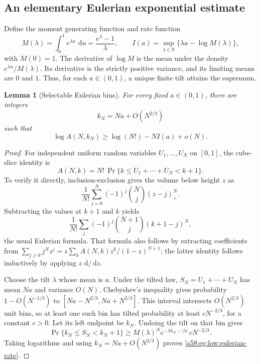 \documentclass[11pt,letterpaper]{article}
\newtheorem{lemma}[theorem]{Lemma}
\theoremstyle{remark}
\newcommand{\egdd}{\,\mathrm d}
\begin{document}
\subsection{An elementary Eulerian exponential estimate}

Define the moment generating function and rate function
\begin{equation}\label{a58:eg:low:rate-def}
 M(\lambda)=\int_0^1 e^{\lambda u}\,\egdd u
 =\frac{e^\lambda-1}{\lambda},\qquad
 I(a)=\sup_{\lambda\in\mathbb R}
 \{\lambda a-\log M(\lambda)\},
\end{equation}
with \(M(0)=1\). The derivative of \(\log M\) is the mean under the
density \(e^{\lambda u}/M(\lambda)\). Its derivative is the strictly
positive variance, and its limiting means are \(0\) and \(1\).
Thus, for each \(a\in(0,1)\), a unique finite tilt attains the supremum.

\begin{lemma}[Selectable Eulerian bins]\label{a58:eg:low:eulerian-bins}
For every fixed \(a\in(0,1)\), there are integers
\[
 k_N=Na+O(N^{2/3})
\]
such that
\begin{equation}\label{a58:eg:low:eulerian-rate}
 \log A(N,k_N)\ge \log(N!)-N I(a)+o(N).
\end{equation}
\end{lemma}

\begin{proof}
For independent uniform random variables \(U_1,\ldots,U_N\) on
\([0,1]\), the cube-slice identity is
\begin{equation}\label{a58:eg:low:cube}
 A(N,k)=N!\,\Pr\{k\le U_1+\cdots+U_N<k+1\}.
\end{equation}
To verify it directly, inclusion-exclusion gives the volume below height
\(z\) as
\[
 \frac1{N!}\sum_{j=0}^N(-1)^j\binom Nj(z-j)_+^N.
\]
Subtracting the values at \(k+1\) and \(k\) yields
\[
 \frac1{N!}\sum_j(-1)^j\binom{N+1}{j}(k+1-j)^N,
\]
the usual Eulerian formula. That formula also follows by extracting
coefficients from
\(\sum_{j\ge0}j^N z^j=z\sum_k A(N,k)z^k/(1-z)^{N+1}\);
the latter identity follows inductively by applying \(z\,\egdd/\egdd z\).

Choose the tilt \(\lambda\) whose mean is \(a\).
Under the tilted law, \(S_N=U_1+\cdots+U_N\) has mean \(Na\) and
variance \(O(N)\). Chebyshev's inequality gives probability
\(1-O(N^{-1/3})\) to
\([Na-N^{2/3},Na+N^{2/3}]\). This interval intersects
\(O(N^{2/3})\) unit bins, so at least one such bin has tilted
probability at least \(cN^{-2/3}\), for a constant \(c>0\).
Let its left endpoint be \(k_N\).
Undoing the tilt on that bin gives
\[
 \Pr\{k_N\le S_N<k_N+1\}
 \ge M(\lambda)^N
       e^{-\lambda k_N-|\lambda|}\,cN^{-2/3}.
\]
Taking logarithms and using \(k_N=Na+O(N^{2/3})\) proves
\eqref{a58:eg:low:eulerian-rate}.
\end{proof}
\end{document}
